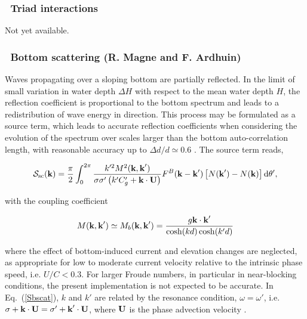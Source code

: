 \subsubsection{~Triad interactions} \label{sec:triad}
\vsssub

Not yet available.


\vsssub
\subsubsection{~Bottom scattering \hfill {\rm (R. Magne and F. Ardhuin)}}
\label{sec:bscat}
\vsssub

Waves propagating over a sloping bottom are partially reflected.  In the limit
of small variation in water depth $\Delta H$ with respect to the mean water
depth $H$, the reflection coefficient is proportional to the bottom spectrum
\cite{art:Kre49} and leads to a redistribution of wave energy in direction.
This process may be formulated as a source term, which leads to accurate
reflection coefficients when considering the evolution of the spectrum over
scales larger than the bottom auto-correlation length, with reasonable
accuracy up to $\Delta d / d \simeq 0.6$ \citep{art:AM07}. The source term
reads,

\begin{equation}
{\cal S}_{\mathrm{sc}}({\mbox{\bf k}}) =
\frac{\pi}{2}\int_{0}^{2 \pi}
 \frac{k'^2 M^2({\mbox{\bf k}},\textbf{k}')}{\sigma \sigma' \left(k' C'_g +
{\mbox{\bf k}}  \cdot {\bf U}  \right)}
 F^B({\mbox{\bf k}}-\textbf{k}')
\left[N(\textbf{k}')- N(\textbf{k})\right] {\mathrm d}
\theta',\label{Sbscat}
\end{equation}

\noindent
with the coupling coefficient

\begin{equation}
M({\mbox{\bf k}},{\mbox{\bf k}}^\prime)\simeq M_b({\mbox{\bf k}},{\mbox{\bf k}}^\prime) =\frac{g {\mbox{\bf k}}
\cdot {\mbox{\bf k}}^\prime}{\cosh(kd)\cosh(k'd)}
\end{equation}

\noindent
 where the effect of bottom-induced current and elevation changes are
neglected, as appropriate for low to moderate current velocity relative to the
intrinsic phase speed, i.e. $U/C < 0.3$. For larger Froude numbers, in
particular in near-blocking conditions, the present implementation is not
expected to be accurate.  In Eq.~(\ref{Sbscat}), $k$ and $k'$ are related by
the resonance condition, $\omega=\omega'$, i.e. $\sigma+{\mbox{\bf k}} \cdot {\bf U}
=\sigma' + {\mbox{\bf k}}^\prime \cdot {\bf U}$, where ${\bf U}$ is the phase advection
velocity \cite[see, e.g.,][]{art:WISE07}.

